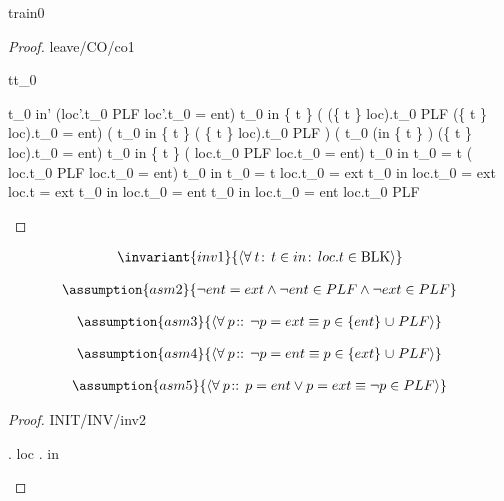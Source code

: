 \documentclass[12pt]{amsart}
\begin{document}
\begin{machine}{train0}
\begin{proof}{leave/CO/co1}
	\begin{free:var}{t}{t_0}
	\begin{calculation}
		t_0 \in in' \land (loc'.t_0 \in PLF \lor loc'.t_0 = ent)
		t_0 \in in \setminus \{ t \} 
		\land ( (\{ t \} \domsub loc).t_0 \in PLF \lor (\{ t \} \domsub loc).t_0 = ent)
	\hint{=}{ }	%
			( 		t_0 \in in \setminus \{ t \} 
			 \land  ( \{ t \} \domsub loc).t_0 \in PLF )
		\lor ( 		t_0 \in (in \setminus \{ t \} )
			 \land (\{ t \} \domsub loc).t_0 = ent)
	\hint{=}{ \ref{inv2} }	%
			t_0 \in in \setminus \{ t \} 
		\land ( loc.t_0 \in PLF \lor  loc.t_0 = ent)
	\hint{=}{ } %
		t_0 \in in \land \neg t_0  = t 
		\land ( loc.t_0 \in PLF \lor  loc.t_0 = ent)
	\hint{=}{ \ref{asm2}, \ref{asm4}, \ref{asm3} } %
		t_0 \in in \land \neg t_0  = t \land \neg loc.t_0 = ext
	\hint{=}{  \ref{grd0} } %
	 	t_0 \in in \land \neg loc.t_0 = ext \land loc.t = ext
	\hint{\follows}{  \ref{grd0}, \ref{asm2} } %
	 	t_0 \in in \land loc.t_0 = ent 
	\hint{=}{ \ref{asm2}  } %
	 	t_0 \in in \land loc.t_0 = ent  \land \neg loc.t_0 \in PLF 
	\end{calculation}
	\end{free:var}
\end{proof}

\begin{align*}
\invariant{inv1}
{	\qforall{t}{t \in in}{loc.t \in \BLK}	}
\end{align*}

\begin{align*}
\assumption{asm2}
{	\neg ent = ext \land \neg ent \in PLF \land \neg ext \in PLF	}
\end{align*}

\begin{align*}
\assumption{asm3}
{	\qforall{p}{}{ \neg p = ext \equiv p \in \{ent\} \bunion PLF }	}
\end{align*}

\begin{align*}
\assumption{asm4}
{	\qforall{p}{}{ \neg p = ent \equiv p \in \{ext\} \bunion PLF }	}
\end{align*}

\begin{align*}
\assumption{asm5}
{	\qforall{p}{}{ p = ent \lor p = ext \equiv \neg p \in PLF }	}
\end{align*}

\begin{proof}{INIT/INV/inv2}
	\begin{calculation}
		\dom. loc
	\hint{=}{ \ref{in1} }
		 \dom . \oftype{ \emptyfun }{ \pfun[\TRAIN, \BLK] }  
	\hint{=}{ empty functions }
		\oftype{ \emptyset }{\set[\TRAIN]}
	\hint{=}{ \ref{in0} }
		in
	\end{calculation}
\end{proof}


\end{machine}
\end{document}
